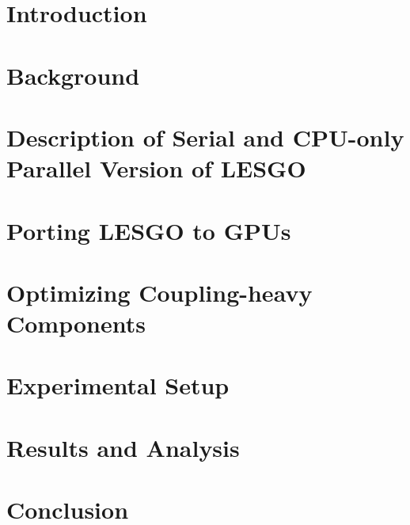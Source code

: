 \documentclass[conference]{IEEEtran}
\begin{document}

\section{Introduction}
\label{sec:intro}


\section{Background}
\label{sec:bg}


\section{Description of Serial and CPU-only Parallel Version of LESGO}
\label{sec:motivation}


\section{Porting LESGO to GPUs}
\label{sec:method}


\section{Optimizing Coupling-heavy Components}
\label{sec:opt}


\section{Experimental Setup}
\label{sec:setup}


\section{Results and Analysis}
\label{sec:results}


\section{Conclusion}
\label{sec:conclusion}


% 



\end{document}
